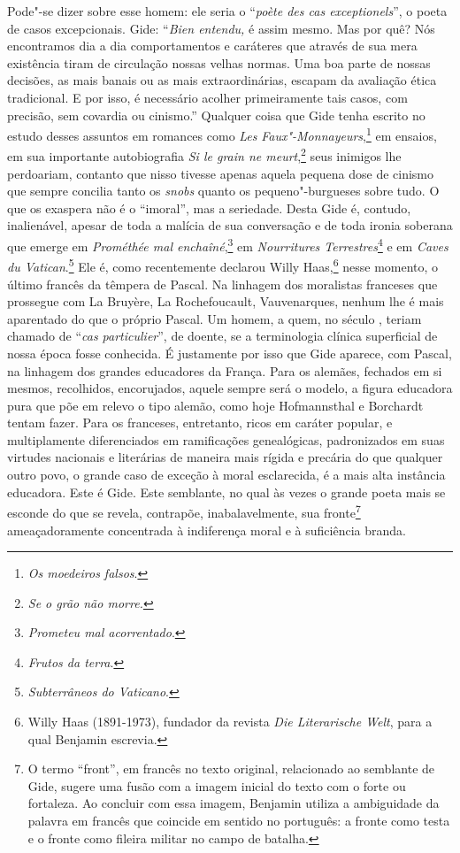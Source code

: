 Pode"-se dizer sobre esse homem: ele seria o ``\emph{poète des cas
exceptionels}'', o poeta de casos excepcionais. Gide: ``\emph{Bien
entendu,} é assim mesmo. Mas por quê? Nós encontramos dia a dia
comportamentos e caráteres que através de sua mera existência tiram de
circulação nossas velhas normas. Uma boa parte de nossas decisões, as
mais banais ou as mais extraordinárias, escapam da avaliação ética
tradicional. E por isso, é necessário acolher primeiramente tais casos,
com precisão, sem covardia ou cinismo.'' Qualquer coisa que Gide tenha
escrito no estudo desses assuntos em romances como \emph{Les}
\emph{Faux"-Monnayeurs},\footnote{\emph{Os moedeiros falsos}. \versal{[N. T.]}}
em ensaios, em sua importante autobiografia \emph{Si le grain ne meurt},\footnote{\emph{Se o grão não morre.} \versal{[N. T.]}} seus inimigos lhe
perdoariam, contanto que nisso tivesse apenas aquela pequena dose de
cinismo que sempre concilia tanto os \emph{snobs} quanto os
pequeno"-burgueses sobre tudo. O que os exaspera não é o ``imoral'', mas a
seriedade. Desta Gide é, contudo, inalienável, apesar de toda a malícia
de sua conversação e de toda ironia soberana que emerge em
\emph{Prométhée mal enchaîné},\footnote{\emph{Prometeu mal
  acorrentado}. \versal{[N. T.]}} em \emph{Nourritures Terrestres}\footnote{\emph{Frutos da terra}. \versal{[N. T.]}} e em \emph{Caves du Vatican}.\footnote{\emph{Subterrâneos do Vaticano}. \versal{[N. T.]}} Ele é, como recentemente declarou Willy Haas,\footnote{Willy Haas (1891-1973), fundador da revista \emph{Die
  Literarische Welt}, para a qual Benjamin escrevia. \versal{[N. E.]}} nesse momento, o
último francês da têmpera de Pascal. Na linhagem dos moralistas
franceses que prossegue com La Bruyère, La Rochefoucault, Vauvenarques,
nenhum lhe é mais aparentado do que o próprio Pascal. Um homem, a quem,
no século , teriam chamado de ``\emph{cas particulier}'', de doente,
se a terminologia clínica superficial de nossa época fosse conhecida. É
justamente por isso que Gide aparece, com Pascal, na linhagem dos
grandes educadores da França. Para os alemães, fechados em si mesmos,
recolhidos, encorujados, aquele sempre será o modelo, a figura educadora
pura que põe em relevo o tipo alemão, como hoje Hofmannsthal e Borchardt
tentam fazer. Para os franceses, entretanto, ricos em caráter popular,
e multiplamente diferenciados em ramificações genealógicas, padronizados
em suas virtudes nacionais e literárias de maneira mais rígida e
precária do que qualquer outro povo, o grande caso de exceção à moral
esclarecida, é a mais alta instância educadora. Este é Gide. Este
semblante, no qual às vezes o grande poeta mais se esconde do que se
revela, contrapõe, inabalavelmente, sua fronte\footnote{O termo
  ``front'', em francês no texto original, relacionado ao semblante de
  Gide, sugere uma fusão com a imagem inicial do texto com o forte ou
  fortaleza. Ao concluir com essa imagem, Benjamin utiliza a ambiguidade
  da palavra em francês que coincide em sentido no português: a fronte
  como testa e o fronte como fileira militar no campo de batalha. \versal{[N. T.]}}
ameaçadoramente concentrada à indiferença moral e à suficiência branda.
